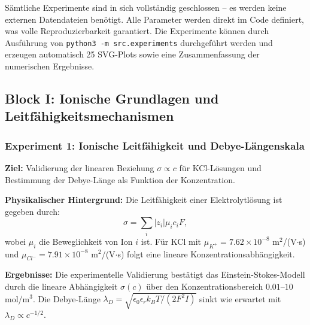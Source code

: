 ﻿\documentclass[a4paper,12pt]{scrreprt}
\theoremstyle{definition}
\begin{document}
Sämtliche Experimente sind in sich vollständig geschlossen -- es werden keine externen Datendateien benötigt. Alle Parameter werden direkt im Code definiert, was volle Reproduzierbarkeit garantiert. Die Experimente können durch Ausführung von \texttt{python3 -m src.experiments} durchgeführt werden und erzeugen automatisch 25 SVG-Plots sowie eine Zusammenfassung der numerischen Ergebnisse.


\subsection{Block I: Ionische Grundlagen und Leitfähigkeitsmechanismen}

\subsubsection{Experiment 1: Ionische Leitfähigkeit und Debye-Längenskala}

\textbf{Ziel:} Validierung der linearen Beziehung $\sigma \propto c$ für KCl-Lösungen und Bestimmung der Debye-Länge als Funktion der Konzentration.

\textbf{Physikalischer Hintergrund:} Die Leitfähigkeit einer Elektrolytlösung ist gegeben durch:
\begin{equation}
	\sigma = \sum_i |z_i| \mu_i c_i F,
\end{equation}
wobei $\mu_i$ die Beweglichkeit von Ion $i$ ist. Für KCl mit $\mu_{K^+} = 7.62 \times 10^{-8}$ m$^2$/(V$\cdot$s) und $\mu_{Cl^-} = 7.91 \times 10^{-8}$ m$^2$/(V$\cdot$s) folgt eine lineare Konzentrationsabhängigkeit.

\textbf{Ergebnisse:} Die experimentelle Validierung bestätigt das Einstein-Stokes-Modell durch die lineare Abhängigkeit $\sigma(c)$ über den Konzentrationsbereich $0.01$--$10$ mol/m$^3$. Die Debye-Länge $\lambda_D = \sqrt{\epsilon_0 \epsilon_r k_B T / (2 F^2 I)}$ sinkt wie erwartet mit $\lambda_D \propto c^{-1/2}$.
\end{document}
